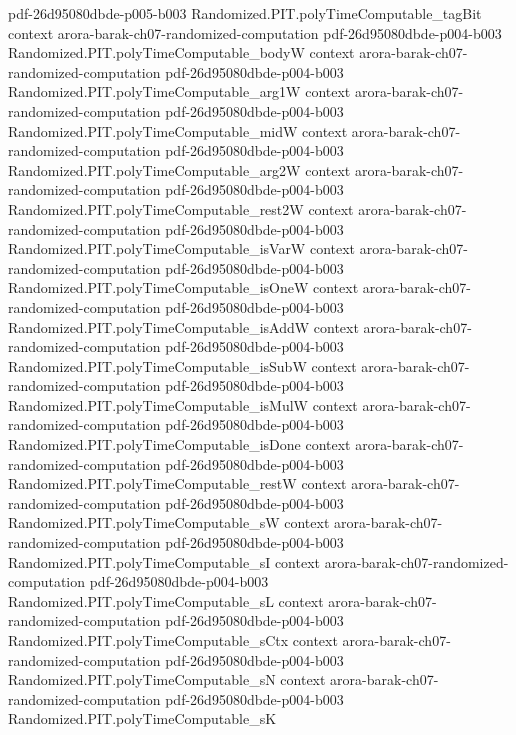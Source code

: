 \begin{theorem}
  {pdf-26d95080dbde-p005-b003}
\proofstep
  {Randomized.PIT.polyTimeComputable_tagBit}
  {context}
  {arora-barak-ch07-randomized-computation}
  {pdf-26d95080dbde-p004-b003}
\proofstep
  {Randomized.PIT.polyTimeComputable_bodyW}
  {context}
  {arora-barak-ch07-randomized-computation}
  {pdf-26d95080dbde-p004-b003}
\proofstep
  {Randomized.PIT.polyTimeComputable_arg1W}
  {context}
  {arora-barak-ch07-randomized-computation}
  {pdf-26d95080dbde-p004-b003}
\proofstep
  {Randomized.PIT.polyTimeComputable_midW}
  {context}
  {arora-barak-ch07-randomized-computation}
  {pdf-26d95080dbde-p004-b003}
\proofstep
  {Randomized.PIT.polyTimeComputable_arg2W}
  {context}
  {arora-barak-ch07-randomized-computation}
  {pdf-26d95080dbde-p004-b003}
\proofstep
  {Randomized.PIT.polyTimeComputable_rest2W}
  {context}
  {arora-barak-ch07-randomized-computation}
  {pdf-26d95080dbde-p004-b003}
\proofstep
  {Randomized.PIT.polyTimeComputable_isVarW}
  {context}
  {arora-barak-ch07-randomized-computation}
  {pdf-26d95080dbde-p004-b003}
\proofstep
  {Randomized.PIT.polyTimeComputable_isOneW}
  {context}
  {arora-barak-ch07-randomized-computation}
  {pdf-26d95080dbde-p004-b003}
\proofstep
  {Randomized.PIT.polyTimeComputable_isAddW}
  {context}
  {arora-barak-ch07-randomized-computation}
  {pdf-26d95080dbde-p004-b003}
\proofstep
  {Randomized.PIT.polyTimeComputable_isSubW}
  {context}
  {arora-barak-ch07-randomized-computation}
  {pdf-26d95080dbde-p004-b003}
\proofstep
  {Randomized.PIT.polyTimeComputable_isMulW}
  {context}
  {arora-barak-ch07-randomized-computation}
  {pdf-26d95080dbde-p004-b003}
\proofstep
  {Randomized.PIT.polyTimeComputable_isDone}
  {context}
  {arora-barak-ch07-randomized-computation}
  {pdf-26d95080dbde-p004-b003}
\proofstep
  {Randomized.PIT.polyTimeComputable_restW}
  {context}
  {arora-barak-ch07-randomized-computation}
  {pdf-26d95080dbde-p004-b003}
\proofstep
  {Randomized.PIT.polyTimeComputable_sW}
  {context}
  {arora-barak-ch07-randomized-computation}
  {pdf-26d95080dbde-p004-b003}
\proofstep
  {Randomized.PIT.polyTimeComputable_sI}
  {context}
  {arora-barak-ch07-randomized-computation}
  {pdf-26d95080dbde-p004-b003}
\proofstep
  {Randomized.PIT.polyTimeComputable_sL}
  {context}
  {arora-barak-ch07-randomized-computation}
  {pdf-26d95080dbde-p004-b003}
\proofstep
  {Randomized.PIT.polyTimeComputable_sCtx}
  {context}
  {arora-barak-ch07-randomized-computation}
  {pdf-26d95080dbde-p004-b003}
\proofstep
  {Randomized.PIT.polyTimeComputable_sN}
  {context}
  {arora-barak-ch07-randomized-computation}
  {pdf-26d95080dbde-p004-b003}
\proofstep
  {Randomized.PIT.polyTimeComputable_sK}

\end{theorem}
